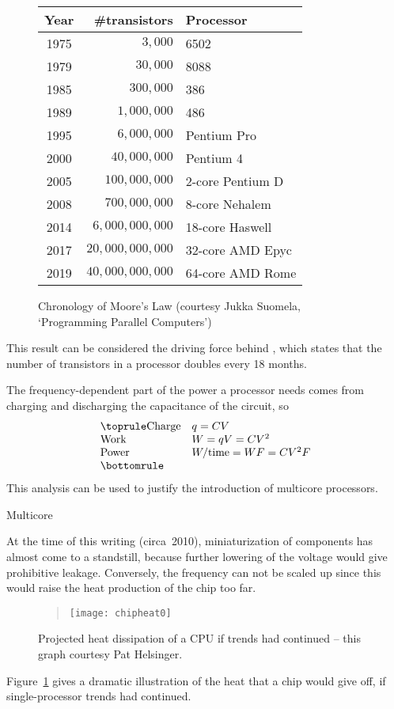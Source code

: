 \begin{wrapfigure}{r}{3in}
\begin{tabular}{crl}
\toprule
Year&\#transistors&Processor\\
\midrule
1975 & $3, 000$ & 6502 \\
1979 & $30, 000$ & 8088 \\
1985 & $300, 000$ & 386 \\
1989 & $1, 000, 000$ & 486 \\
1995 & $6, 000, 000$ & Pentium Pro \\
2000 & $40, 000, 000$ & Pentium 4 \\
2005 & $100, 000, 000$ & 2-core Pentium D \\
2008 & $700, 000, 000$ & 8-core Nehalem \\
2014 & $6, 000, 000, 000$ & 18-core Haswell \\
2017 & $20, 000, 000, 000$ & 32-core AMD Epyc \\
2019 & $40, 000, 000, 000$ & 64-core AMD Rome \\
\bottomrule
\end{tabular}
Chronology of Moore's Law (courtesy Jukka Suomela, `Programming Parallel Computers')
\end{wrapfigure}
%
This result can be considered
the driving force behind ,
which states that the number of transistors in a processor
doubles every 18 months.

The frequency-dependent part of the power a processor needs
comes from charging and discharging the capacitance of the circuit, so
\begin{equation}
\begin{array}{ll} \toprule
\hbox{Charge}&q=CV\\
\hbox{Work}&W=qV=CV^2\\
\hbox{Power}&W/\hbox{time}=WF=CV^2F \\ \bottomrule
\end{array}
\label{eq:power}
\end{equation}
This analysis can be used to justify the introduction of multicore processors.

 {Multicore}

At the time of this writing (circa~2010), miniaturization of
components has almost come to a standstill, because further lowering
of the voltage would give prohibitive leakage. Conversely, the
frequency can not be scaled up since this would raise the heat
production of the chip too far. 
%
\begin{figure}[ht]
  \begin{quote}
  \texttt{[image: chipheat0]}
  \end{quote}
  \caption{Projected heat dissipation of a CPU if trends had
    continued -- this graph courtesy Pat Helsinger.}
  \label{fig:chipheat}
\end{figure}
%
Figure~\ref{fig:chipheat} gives a dramatic illustration of the heat
that a chip would give off, if single-processor trends had
continued.

